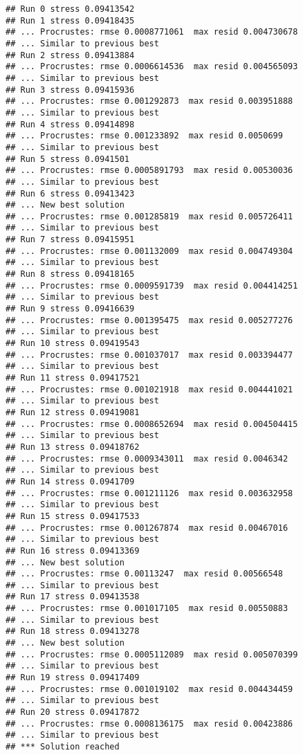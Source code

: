 \documentclass[
]{article}
\begin{document}
\begin{verbatim}
## Run 0 stress 0.09413542 
## Run 1 stress 0.09418435 
## ... Procrustes: rmse 0.0008771061  max resid 0.004730678 
## ... Similar to previous best
## Run 2 stress 0.09413884 
## ... Procrustes: rmse 0.0006614536  max resid 0.004565093 
## ... Similar to previous best
## Run 3 stress 0.09415936 
## ... Procrustes: rmse 0.001292873  max resid 0.003951888 
## ... Similar to previous best
## Run 4 stress 0.09414898 
## ... Procrustes: rmse 0.001233892  max resid 0.0050699 
## ... Similar to previous best
## Run 5 stress 0.0941501 
## ... Procrustes: rmse 0.0005891793  max resid 0.00530036 
## ... Similar to previous best
## Run 6 stress 0.09413423 
## ... New best solution
## ... Procrustes: rmse 0.001285819  max resid 0.005726411 
## ... Similar to previous best
## Run 7 stress 0.09415951 
## ... Procrustes: rmse 0.001132009  max resid 0.004749304 
## ... Similar to previous best
## Run 8 stress 0.09418165 
## ... Procrustes: rmse 0.0009591739  max resid 0.004414251 
## ... Similar to previous best
## Run 9 stress 0.09416639 
## ... Procrustes: rmse 0.001395475  max resid 0.005277276 
## ... Similar to previous best
## Run 10 stress 0.09419543 
## ... Procrustes: rmse 0.001037017  max resid 0.003394477 
## ... Similar to previous best
## Run 11 stress 0.09417521 
## ... Procrustes: rmse 0.001021918  max resid 0.004441021 
## ... Similar to previous best
## Run 12 stress 0.09419081 
## ... Procrustes: rmse 0.0008652694  max resid 0.004504415 
## ... Similar to previous best
## Run 13 stress 0.09418762 
## ... Procrustes: rmse 0.0009343011  max resid 0.0046342 
## ... Similar to previous best
## Run 14 stress 0.0941709 
## ... Procrustes: rmse 0.001211126  max resid 0.003632958 
## ... Similar to previous best
## Run 15 stress 0.09417533 
## ... Procrustes: rmse 0.001267874  max resid 0.00467016 
## ... Similar to previous best
## Run 16 stress 0.09413369 
## ... New best solution
## ... Procrustes: rmse 0.00113247  max resid 0.00566548 
## ... Similar to previous best
## Run 17 stress 0.09413538 
## ... Procrustes: rmse 0.001017105  max resid 0.00550883 
## ... Similar to previous best
## Run 18 stress 0.09413278 
## ... New best solution
## ... Procrustes: rmse 0.0005112089  max resid 0.005070399 
## ... Similar to previous best
## Run 19 stress 0.09417409 
## ... Procrustes: rmse 0.001019102  max resid 0.004434459 
## ... Similar to previous best
## Run 20 stress 0.09417872 
## ... Procrustes: rmse 0.0008136175  max resid 0.00423886 
## ... Similar to previous best
## *** Solution reached
\end{verbatim}
\end{document}
